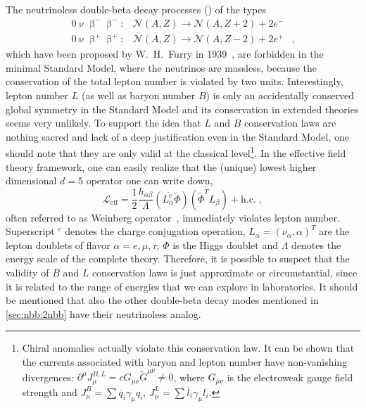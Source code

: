 The neutrinoless double-beta decay processes (\onbb) of the types
\[
  \begin{array}{lrl}
    0\upnu\upbeta^-\upbeta^-: &
      \mathcal{N}(A,Z) \longrightarrow \mathcal{N}(A,Z+2)+2e^- & \\
    0\upnu\upbeta^+\upbeta^+: &
      \mathcal{N}(A,Z) \longrightarrow \mathcal{N}(A,Z-2)+2e^+ &,
  \end{array}
\]
which have been proposed by W.~H.~Furry in 1939~\cite{Furry1939}, are forbidden
in the minimal Standard Model, where the neutrinos are massless, because the
conservation of the total lepton number is violated by two units.
Interestingly, lepton number $L$ (as well as baryon number $B$) is only an
accidentally conserved global symmetry in the Standard Model and its
conservation in extended theories seems very unlikely. To support the idea that
$L$ and $B$ conservation laws are nothing sacred and lack of a deep
justification even in the Standard Model, one should note that they are only
valid at the classical level\footnote{Chiral anomalies actually violate this
conservation law. It can be shown that the currents associated with baryon
and lepton number have non-vanishing divergences: $\partial^\mu J_\mu^{B,L} =
c G_{\mu\nu} \widetilde{G}^{\mu\nu} \neq 0$, where $G_{\mu\nu}$ is the
electroweak gauge field strength and $J_\mu^B = \sum \overline{q}_i \gamma_\mu
q_i$, $J_\mu^L = \sum \overline{l}_i \gamma_\mu l_i$.}. In the effective field
theory framework, one can easily realize that the (unique) lowest higher dimensional
$d=5$ operator one can write down,
\[
  \mathcal{L}_\text{eff} = \frac{1}{2} \frac{h_{\alpha\beta}}{\Lambda}
                           (\overline{L_\alpha^c}\widetilde{\Phi})
                           (\widetilde{\Phi}^T L_\beta) + \text{h.c.} \;,
\]
often referred to as Weinberg operator~\cite{Weinberg1979}, immediately
violates lepton number. Superscript $^c$ denotes the charge conjugation
operation, $L_\alpha = (\nu_\alpha, \alpha)^T$ are the lepton doublets of
flavor $\alpha = e, \mu, \tau$, $\Phi$ is the Higgs doublet and $\Lambda$
denotes the energy scale of the complete theory. Therefore, it
is possible to suspect that the validity of $B$ and $L$ conservation laws is
just approximate or circumstantial, since it is related to the range of
energies that we can explore in laboratories.  It should be mentioned that also
the other double-beta decay modes mentioned in \cref{sec:nbb:2nbb} have their
neutrinoless analog.

